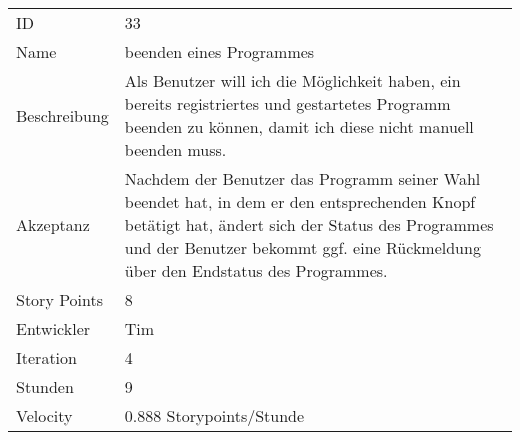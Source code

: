 \begin{table}[htbp]
\begin{minipage}{\linewidth}
\setlength{\tymax}{0.5\linewidth}
\centering
\small
\begin{tabulary}{\textwidth}{|l| p{10cm}|} \toprule
 ID   &33\\


Name  &beenden eines Programmes\\
Beschreibung&Als Benutzer will ich die Möglichkeit haben, ein bereits registriertes und gestartetes Programm beenden zu können, damit ich diese nicht manuell beenden muss.\\
Akzeptanz &Nachdem der Benutzer das Programm seiner Wahl beendet hat, in dem er den entsprechenden Knopf betätigt hat, ändert sich der Status des Programmes und der Benutzer bekommt ggf. eine Rückmeldung über den Endstatus des Programmes.\\
Story Points&8\\
Entwickler &Tim\\
Iteration &4\\
Stunden  &9\\
Velocity &0.888 Storypoints\slash Stunde\\
\bottomrule

\end{tabulary}
\end{minipage}
\end{table}




